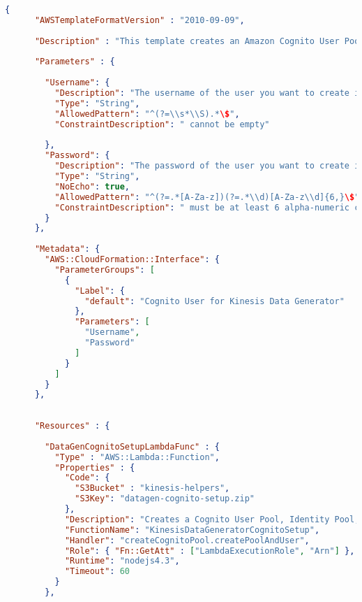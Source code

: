     \begin{lstlisting}[language=json,firstnumber=1]
    {
      "AWSTemplateFormatVersion" : "2010-09-09",
      
      "Description" : "This template creates an Amazon Cognito User Pool and Identity Pool, with a single user.  It assigns a role to authenticated users in the identity pool to enable the users to use the Kinesis Data Generator tool.",
      
      "Parameters" : {
    
        "Username": {
          "Description": "The username of the user you want to create in Amazon Cognito.",
          "Type": "String",
          "AllowedPattern": "^(?=\\s*\\S).*\$",
          "ConstraintDescription": " cannot be empty"
    
        },
        "Password": {
          "Description": "The password of the user you want to create in Amazon Cognito.",
          "Type": "String",
          "NoEcho": true,
          "AllowedPattern": "^(?=.*[A-Za-z])(?=.*\\d)[A-Za-z\\d]{6,}\$",
          "ConstraintDescription": " must be at least 6 alpha-numeric characters, and contain at least one number"
        }
      },
      
      "Metadata": {
        "AWS::CloudFormation::Interface": {
          "ParameterGroups": [
            {
              "Label": {
                "default": "Cognito User for Kinesis Data Generator"
              },
              "Parameters": [
                "Username",
                "Password"
              ]
            }
          ]
        }
      },
      
      
      "Resources" : {
    
        "DataGenCognitoSetupLambdaFunc" : {
          "Type" : "AWS::Lambda::Function",
          "Properties" : {
            "Code": {
              "S3Bucket" : "kinesis-helpers",
              "S3Key": "datagen-cognito-setup.zip"
            },
            "Description": "Creates a Cognito User Pool, Identity Pool, and a User.  Returns IDs to be used in the Kinesis Data Generator.",
            "FunctionName": "KinesisDataGeneratorCognitoSetup",
            "Handler": "createCognitoPool.createPoolAndUser",
            "Role": { "Fn::GetAtt" : ["LambdaExecutionRole", "Arn"] },
            "Runtime": "nodejs4.3",
            "Timeout": 60
          }
        },
        

\end{lstlisting}
